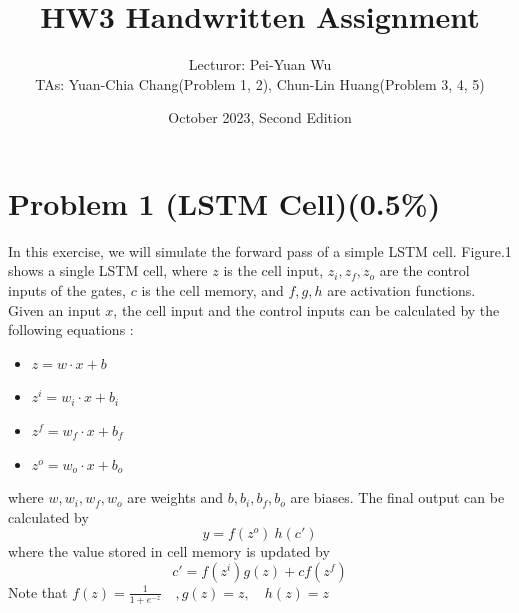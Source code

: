 \documentclass{article}
\title{HW3 Handwritten Assignment}
\author{Lecturor: Pei-Yuan Wu\\
TAs: {Yuan-Chia Chang(Problem 1, 2), Chun-Lin Huang(Problem 3, 4, 5)}}
\date{October 2023, Second Edition}
\begin{document}
\maketitle

\section*{Problem 1 (LSTM Cell)(0.5\%)}
In this exercise, we will simulate the forward pass of a simple LSTM cell. Figure.1 shows a single LSTM cell, where $z$ is the cell input, $z_i, z_f, z_o$ are the control inputs of the gates, $c$ is the cell memory, and $f, g, h$ are activation functions. Given an input $x$, the cell input and the control inputs can be calculated by the following equations :
\begin{itemize}
    \item $z = w \cdot x + b$
    \item $z^i = w_i \cdot x + b_i$
    \item $z^f = w_f \cdot x + b_f$
    \item $z^o = w_o \cdot x + b_o$
\end{itemize}
where $w, w_i, w_f, w_o$ are weights and $b, b_i, b_f, b_o$ are biases. The final output can be calculated by
$$y = f(z^o)\ h(c')$$
where the value stored in cell memory is updated by
$$c'=f(z^i)g(z)+cf(z^f)$$
Note that $f(z) = \frac{1}{1+e^{-z}}\quad , g(z) = z,\quad h(z) = z$
\end{document}

